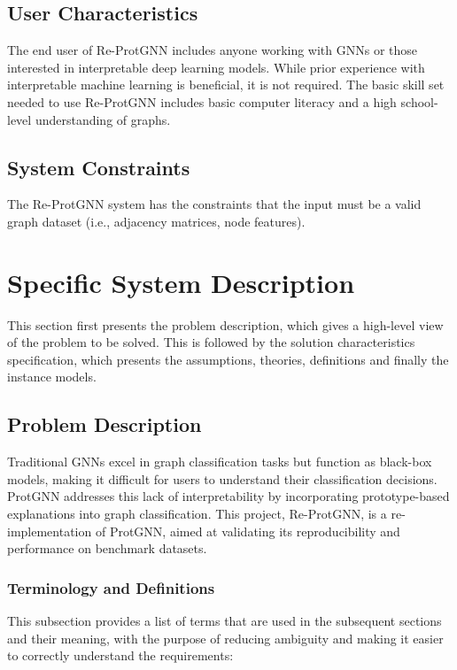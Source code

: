 \documentclass[12pt]{article}
\begin{document}
\subsection{User Characteristics} \label{SecUserCharacteristics}

The end user of Re-ProtGNN includes anyone working with GNNs or those interested in interpretable deep learning models. While prior experience with interpretable machine learning is beneficial, it is not required. The basic skill set needed to use Re-ProtGNN includes basic computer literacy and a high school-level understanding of graphs.




\subsection{System Constraints}

The Re-ProtGNN system has the constraints that the input must be a valid graph dataset (i.e., adjacency matrices, node features).

\section{Specific System Description}

This section first presents the problem description, which gives a high-level
view of the problem to be solved.  This is followed by the solution characteristics
specification, which presents the assumptions, theories, definitions and finally
the instance models.

\subsection{Problem Description} \label{Sec_pd}
Traditional GNNs excel in graph classification tasks but function as black-box models, making it difficult for users to understand their classification decisions. ProtGNN addresses this lack of interpretability by incorporating prototype-based explanations into graph classification. This project, Re-ProtGNN, is a re-implementation of ProtGNN, aimed at validating its reproducibility and performance on benchmark datasets.


\subsubsection{Terminology and  Definitions}

This subsection provides a list of terms that are used in the subsequent
sections and their meaning, with the purpose of reducing ambiguity and making it
easier to correctly understand the requirements:
\end{document}
